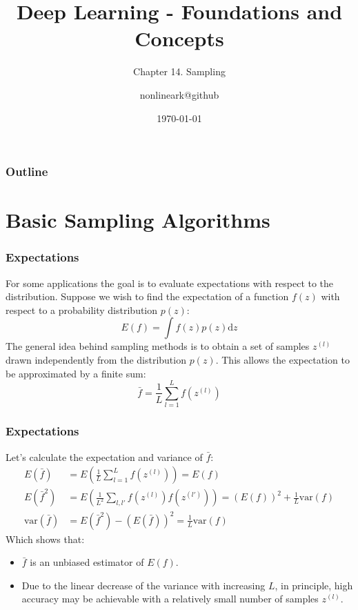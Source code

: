 \documentclass{beamer}
\title{Deep Learning - Foundations and Concepts}
\subtitle{Chapter 14. Sampling}
\author{nonlineark@github}
\date{\today}
\begin{document}
\begin{frame}
    \titlepage
\end{frame}

\begin{frame}
    \frametitle{Outline}
    \tableofcontents
\end{frame}

\section{Basic Sampling Algorithms}

\begin{frame}
    \frametitle{Expectations}
    For some applications the goal is to evaluate expectations with respect to the distribution. Suppose we wish to find the expectation of a function $f(z)$ with respect to a probability distribution $p(z)$:
    \begin{equation*}
        E(f)=\int{}f(z)p(z)\mathrm{d}z
    \end{equation*}
    The general idea behind sampling methods is to obtain a set of samples $z^{(l)}$ drawn independently from the distribution $p(z)$. This allows the expectation to be approximated by a finite sum:
    \begin{equation*}
        \bar{f}=\frac{1}{L}\sum_{l=1}^{L}f(z^{(l)})
    \end{equation*}
\end{frame}

\begin{frame}
    \frametitle{Expectations}
    Let's calculate the expectation and variance of $\bar{f}$:
    \begin{align*}
        E(\bar{f})&=E(\frac{1}{L}\sum_{l=1}^{L}f(z^{(l)}))=E(f) \\
        E(\bar{f}^{2})&=E(\frac{1}{L^{2}}\sum_{l,l'}f(z^{(l)})f(z^{(l')}))=(E(f))^{2}+\frac{1}{L}\mathrm{var}(f) \\
        \mathrm{var}(\bar{f})&=E(\bar{f}^{2})-(E(\bar{f}))^{2}=\frac{1}{L}\mathrm{var}(f)
    \end{align*}
    Which shows that:
    \begin{itemize}
        \item $\bar{f}$ is an unbiased estimator of $E(f)$.
        \item Due to the linear decrease of the variance with increasing $L$, in principle, high accuracy may be achievable with a relatively small number of samples $z^{(l)}$.
    \end{itemize}
\end{frame}
\end{document}
